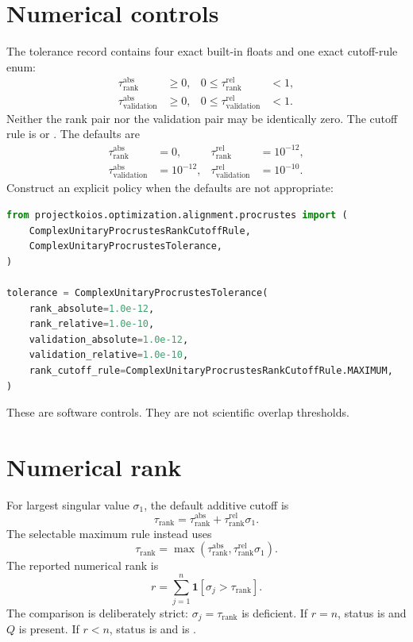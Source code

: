 \section{Numerical controls}
The tolerance record contains four exact built-in floats and one exact cutoff-rule enum:
\begin{align*}
  \tau_{\mathrm{rank}}^{\mathrm{abs}} &\ge 0,
  &0\le\tau_{\mathrm{rank}}^{\mathrm{rel}}&<1,\\
  \tau_{\mathrm{validation}}^{\mathrm{abs}} &\ge 0,
  &0\le\tau_{\mathrm{validation}}^{\mathrm{rel}}&<1.
\end{align*}
Neither the rank pair nor the validation pair may be identically zero. The cutoff rule
is  or . The defaults are
\begin{align*}
  \tau_{\mathrm{rank}}^{\mathrm{abs}} &=0,
  &\tau_{\mathrm{rank}}^{\mathrm{rel}}&=10^{-12},\\
  \tau_{\mathrm{validation}}^{\mathrm{abs}}&=10^{-12},
  &\tau_{\mathrm{validation}}^{\mathrm{rel}}&=10^{-10}.
\end{align*}
Construct an explicit policy when the defaults are not appropriate:
\begin{lstlisting}[language=Python]
from projectkoios.optimization.alignment.procrustes import (
    ComplexUnitaryProcrustesRankCutoffRule,
    ComplexUnitaryProcrustesTolerance,
)

tolerance = ComplexUnitaryProcrustesTolerance(
    rank_absolute=1.0e-12,
    rank_relative=1.0e-10,
    validation_absolute=1.0e-12,
    validation_relative=1.0e-10,
    rank_cutoff_rule=ComplexUnitaryProcrustesRankCutoffRule.MAXIMUM,
)
\end{lstlisting}
These are software controls. They are not scientific overlap thresholds.

\section{Numerical rank}
For largest singular value $\sigma_1$, the default additive cutoff is
\[
  \tau_{\mathrm{rank}}
  =\tau_{\mathrm{rank}}^{\mathrm{abs}}
   +\tau_{\mathrm{rank}}^{\mathrm{rel}}\sigma_1.
\]
The selectable maximum rule instead uses
\[
  \tau_{\mathrm{rank}}
  =\max\!\left(\tau_{\mathrm{rank}}^{\mathrm{abs}},
   \tau_{\mathrm{rank}}^{\mathrm{rel}}\sigma_1\right).
\]
The reported numerical rank is
\[
  r=\sum_{j=1}^{n}\mathbf{1}[\sigma_j>\tau_{\mathrm{rank}}].
\]
The comparison is deliberately strict: $\sigma_j=\tau_{\mathrm{rank}}$ is deficient.
If $r=n$, status is  and $Q$ is present. If $r<n$, status is
 and  is .

